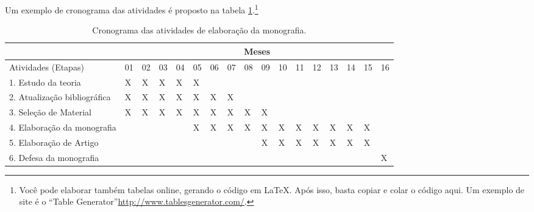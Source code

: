 Um exemplo de cronograma das atividades é proposto na tabela \ref{tab:cronograma}.\footnote{Voc{\^e} pode elaborar também tabelas online, gerando o código em \LaTeX. Após isso, basta copiar e colar o código aqui. Um exemplo de site é o ``Table Generator''\url{http://www.tablesgenerator.com/}.}
  
\begin{table}[h]
\ABNTEXfontereduzida
\caption[Cronograma das atividades]{Cronograma das atividades de elaboração da monografia.}
\label{tab:cronograma}
\begin{minipage}{0.3\textwidth}
    \centering
\begin{tabular}{|l|l|l|l|l|l|l|l|l|l|l|l|l|l|l|l|l|}
\hline
                             & \multicolumn{16}{c|}{Meses}                                                   \\ \hline
Atividades (Etapas)          & 01 & 02 & 03 & 04 & 05 & 06 & 07 & 08 & 09 & 10 & 11 & 12 & 13 & 14 & 15 & 16 \\ \hline
1. Estudo da teoria          & X  & X  & X  & X  & X  &    &    &    &    &    &    &    &    &    &    &    \\ \hline
2. Atualização bibliográfica & X  & X  & X  & X  & X  & X  & X  &    &    &    &    &    &    &    &    &    \\ \hline
3. Seleção de Material       & X  & X  & X  & X  & X  & X  & X  & X  & X  &    &    &    &    &    &    &    \\ \hline
4. Elaboração da monografia  &    &    &    &    & X  & X  & X  & X  & X  & X  & X  & X  & X  & X  & X  &    \\ \hline
5. Elaboração de Artigo      &    &    &    &    &    &    &    &    & X  & X  & X  & X  & X  & X  & X  &    \\ \hline
6. Defesa da monografia      &    &    &    &    &    &    &    &    &    &    &    &    &    &    &    & X  \\ \hline
\end{tabular}
  \end{minipage}
\end{table}